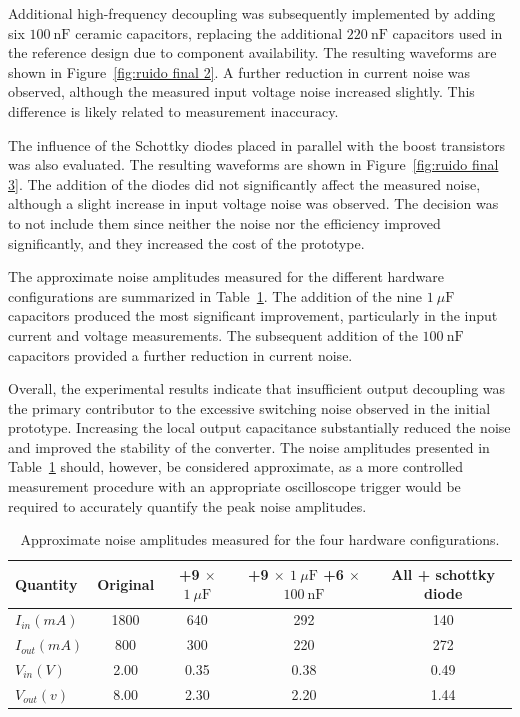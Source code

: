         Additional high-frequency decoupling was subsequently implemented by adding six $100~\mathrm{nF}$ ceramic capacitors, replacing the additional $220~\mathrm{nF}$ capacitors used in the reference design due to component availability. The resulting waveforms are shown in Figure~\ref{fig:ruido final 2}. A further reduction in current noise was observed, although the measured input voltage noise increased slightly. This difference is likely related to measurement inaccuracy.

        The influence of the Schottky diodes placed in parallel with the boost transistors was also evaluated. The resulting waveforms are shown in Figure~\ref{fig:ruido final 3}. The addition of the diodes did not significantly affect the measured noise, although a slight increase in input voltage noise was observed. The decision was to not include them since neither the noise nor the efficiency improved significantly, and they increased the cost of the prototype.

        The approximate noise amplitudes measured for the different hardware configurations are summarized in Table~\ref{tab:noise_comparison}. The addition of the nine $1~\mu\mathrm{F}$ capacitors produced the most significant improvement, particularly in the input current and voltage measurements. The subsequent addition of the $100~\mathrm{nF}$ capacitors provided a further reduction in current noise.

        Overall, the experimental results indicate that insufficient output decoupling was the primary contributor to the excessive switching noise observed in the initial prototype. Increasing the local output capacitance substantially reduced the noise and improved the stability of the converter. The noise amplitudes presented in Table~\ref{tab:noise_comparison} should, however, be considered approximate, as a more controlled measurement procedure with an appropriate oscilloscope trigger would be required to accurately quantify the peak noise amplitudes.


        \begin{table}[!ht]
            \centering
            \caption{Approximate noise amplitudes measured for the four hardware configurations.}
            \label{tab:noise_comparison}
            \begin{tabular}{|l|cccc|}
                \hline
                Quantity &
                Original &
                +9 $\times$ $1~\mu\mathrm{F}$ &
                +9 $\times$ $1~\mu\mathrm{F}$ +6 $\times$ $100~\mathrm{nF}$ &
                All + schottky diode\\
                \hline
                $I_{in} (mA)$  & 1800   & 640 & 292 & 140 \\
                $I_{out} (mA)$ & 800   & 300 & 220 & 272 \\
                $V_{in} (V)$  & 2.00   & 0.35 & 0.38 & 0.49 \\
                $V_{out} (v)$ & 8.00   & 2.30  & 2.20  & 1.44 \\
                \hline 
            \end{tabular}
        \end{table}

